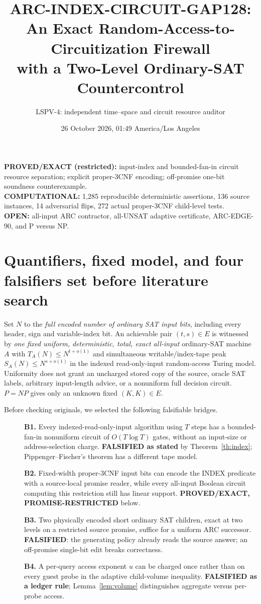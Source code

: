 \documentclass[11pt]{article}
\title{ARC-INDEX-CIRCUIT-GAP128:\\ An Exact Random-Access-to-Circuitization Firewall\\with a Two-Level Ordinary-SAT Countercontrol}
\author{LSPV-4: independent time--space and circuit resource auditor}
\date{26 October 2026, 01:49 America/Los Angeles}
\begin{document}
\maketitle
\begin{center}
\textbf{PROVED/EXACT (restricted):} input-index and bounded-fan-in circuit resource separation; explicit proper-3CNF encoding; off-promise one-bit soundness counterexample.\\
\textbf{COMPUTATIONAL:} 1,285 reproducible deterministic assertions, 136 source instances, 14 adversarial flips, 272 actual proper-3CNF child-level tests.\\
\textbf{OPEN:} all-input ARC contractor, all-UNSAT adaptive certificate, ARC-EDGE-90, and P versus NP.
\end{center}

\section{Quantifiers, fixed model, and four falsifiers set before literature search}
Set $N$ to the \emph{full encoded number of ordinary SAT input bits}, including every header, sign and variable-index bit. An achievable pair $(t,s)\in E$ is witnessed by \emph{one fixed uniform, deterministic, total, exact all-input} ordinary-SAT machine $A$ with
$T_A(N)\le N^{t+o(1)}$ and simultaneous writable/index-tape peak $S_A(N)\le N^{s+o(1)}$ in the indexed read-only-input random-access Turing model. Uniformity does not grant an uncharged stored copy of the source, oracle SAT labels, arbitrary input-length advice, or a nonuniform full decision circuit. $P=NP$ gives only an unknown fixed $(K,K)\in E$.

Before checking originals, we selected the following falsifiable bridges.
\begin{description}
\item[] \textbf{B1.} Every indexed-read-only-input algorithm using $T$ steps has a bounded-fan-in nonuniform circuit of $O(T\log T)$ gates, without an input-size or address-selection charge. \textbf{FALSIFIED as stated} by Theorem~\ref{th:index}; Pippenger--Fischer's theorem has a different tape model.
\item[] \textbf{B2.} Fixed-width proper-3CNF input bits can encode the INDEX predicate with a source-local promise reader, while every all-input Boolean circuit computing this restriction still has linear support. \textbf{PROVED/EXACT, PROMISE-RESTRICTED} below.
\item[] \textbf{B3.} Two physically encoded short ordinary SAT children, exact at two levels on a restricted source promise, suffice for a uniform ARC successor. \textbf{FALSIFIED}: the generating policy already reads the source answer; an off-promise single-bit edit breaks correctness.
\item[] \textbf{B4.} A per-query access exponent $u$ can be charged once rather than on every guest probe in the adaptive child-volume inequality. \textbf{FALSIFIED as a ledger rule}; Lemma~\ref{lem:volume} distinguishes aggregate versus per-probe access.
\end{description}
\end{document}
